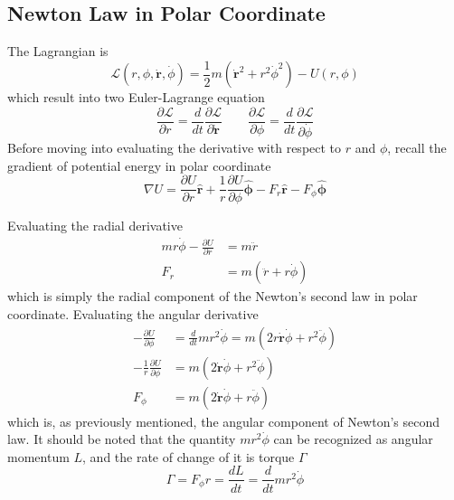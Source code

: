 \documentclass[../../../main.tex]{subfiles}
\begin{document}
\subsection*{Newton Law in Polar Coordinate}
The Lagrangian is
\begin{equation*}
	\mathcal{L}(r,\phi,\dot{\mathbf{r}},\dot{\phi})=\frac{1}{2}m(\dot{\mathbf{r}}^2+r^2\dot{\phi}^2)-U(r,\phi)
\end{equation*}
which result into two Euler-Lagrange equation
\begin{equation*}
	\frac{\partial\mathcal{L}}{\partial r}=\frac{d}{dt}\frac{\partial\mathcal{L}}{\partial \dot{\mathbf{r}}}\qquad\frac{\partial\mathcal{L}}{\partial \phi}=\frac{d}{dt}\frac{\partial\mathcal{L}}{\partial \dot{\phi}}
\end{equation*}
Before moving into evaluating the derivative with respect to $r$ and $\phi$, recall the gradient of potential energy in polar coordinate
\begin{equation*}
	\nabla U=\frac{\partial U}{\partial r}\mathbf{\hat{{r}}}+ \frac{1}{r}\frac{\partial U}{\partial \phi}\boldsymbol{\hat{\phi}}-F_r\mathbf{\hat{r}}-F_{\phi}\boldsymbol{\hat{\phi}}
\end{equation*}

Evaluating the radial derivative
\begin{align*}
	mr\dot{\phi}-\frac{\partial U}{\partial r} & =m\ddot{r}               \\
	F_r                                        & =m(\ddot{r}+r\dot{\phi})
\end{align*}
which is simply the radial component of the Newton's second law in polar coordinate.
Evaluating the angular derivative
\begin{align*}
	-\frac{\partial U}{\partial \phi}            & =\frac{d}{dt}mr^2\dot{\phi}=m(2r\dot{\mathbf{r}}\dot{\phi}+r^2\ddot{\phi}) \\
	-\frac{1}{r}\frac{\partial U}{\partial \phi} & =m(2\dot{\mathbf{r}}\dot{\phi}+r^2\ddot{\phi})                             \\
	F_\phi                                       & =m(2\dot{\mathbf{r}}\dot{\phi}+r\ddot{\phi})
\end{align*}
which is, as previously mentioned, the angular component of Newton's second law. It should be noted that the quantity $mr^2\dot{\phi}$ can be recognized as angular momentum $L$, and the rate of change of it is torque $\Gamma$
\begin{equation*}
	\Gamma=F_\phi r=\frac{dL}{dt}=\frac{d}{dt}mr^2\dot{\phi}
\end{equation*}
\end{document}
